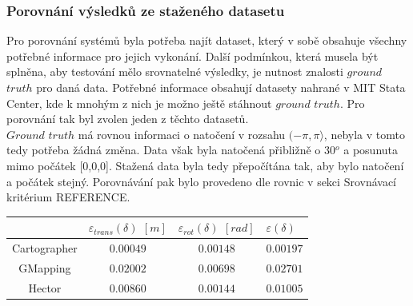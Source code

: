 \documentclass[12pt]{article}
\begin{document}
\newpage 
\subsubsection{Porovnání výsledků ze staženého datasetu}
Pro porovnání systémů byla potřeba najít dataset, který v sobě obsahuje všechny potřebné informace pro jejich vykonání. Další podmínkou, která musela být splněna, aby testování mělo srovnatelné výsledky, je nutnost znalosti $ground$ $truth$ pro daná data. Potřebné informace obsahují datasety nahrané v MIT Stata Center, kde k mnohým z nich je možno ještě stáhnout $ground$ $truth$. Pro porovnání tak byl zvolen jeden z těchto datasetů.\\
\indent $Ground$ $truth$ má rovnou informaci o natočení v rozsahu $(-\pi,\pi\rangle$, nebyla v tomto tedy potřeba žádná změna. Data však byla natočená přibližně o 30$^o$ a posunuta mimo počátek [0,0,0]. Stažená data byla tedy přepočítána tak, aby bylo natočení a počátek stejný. Porovnávání pak bylo provedeno dle rovnic v sekci Srovnávací kritérium REFERENCE.\\
\begin{center}
	\begin{tabular}{c|ccp{3cm}}
		\bfseries \bfseries  & $\varepsilon_{trans}(\delta)$ $[m]$ & $\varepsilon_{rot}(\delta)$ $[rad]$ & $\varepsilon(\delta)$  \\ [2mm]
		\hline
		Cartographer & $0.00049$ & $0.00148$ & $0.00197$  \\
		GMapping & $0.02002$ & $0.00698$ & $0.02701$  \\ 
		Hector & $0.00860$ & $0.00144$ & $0.01005$  \\ 
	\end{tabular}
\end{center}
\end{document}
